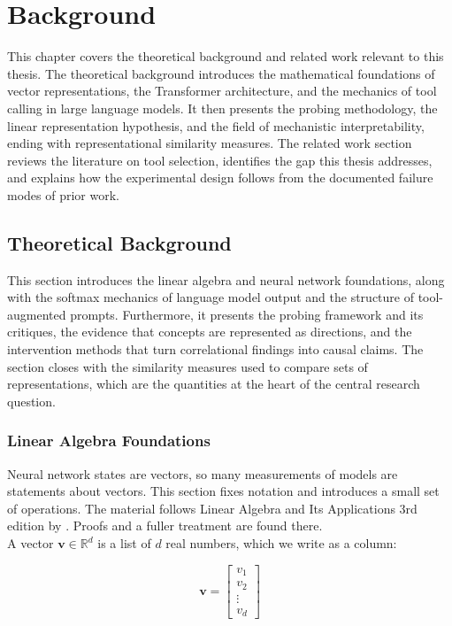 \chapter{Background}
\label{ch:background}

This chapter covers the theoretical background and related work relevant to this thesis.
The theoretical background introduces the mathematical foundations of vector representations, the Transformer architecture, and the mechanics of tool calling in large language models.
It then presents the probing methodology, the linear representation hypothesis, and the field of mechanistic interpretability, ending with representational similarity measures.
The related work section reviews the literature on tool selection, identifies the gap this thesis addresses, and explains how the experimental design follows from the documented failure modes of prior work.

\section{Theoretical Background}
\label{sec:theoretical}

This section introduces the linear algebra and neural network foundations, along with the softmax mechanics of language model output and the structure of tool-augmented prompts.
Furthermore, it presents the probing framework and its critiques, the evidence that concepts are represented as directions, and the intervention methods that turn correlational findings into causal claims.
The section closes with the similarity measures used to compare sets of representations, which are the quantities at the heart of the central research question.

\subsection{Linear Algebra Foundations}
\label{sec:linearalgebra}

Neural network states are vectors, so many measurements of models are statements about vectors.
This section fixes notation and introduces a small set of operations.
The material follows Linear Algebra and Its Applications 3rd edition by \textcite{lay2006linear}.
Proofs and a fuller treatment are found there.
\\

A vector $\mathbf{v} \in \mathbb{R}^d$ is a list of $d$ real numbers, which we write as a column:

\begin{equation}
\mathbf{v} = \begin{bmatrix} v_1 \\ v_2 \\ \vdots \\ v_d \end{bmatrix}
\label{eq:vector}
\end{equation}

